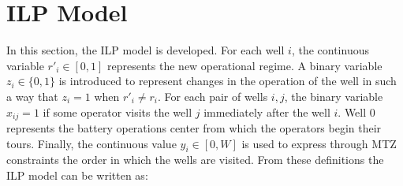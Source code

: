 \section{ILP Model} \label{sec:modelo}
In this section, the ILP model is developed. For each well $i$, the continuous variable $r'_i \in [0,1]$ represents the new operational regime. A binary variable $z_i \in \{0,1\}$ is introduced to represent changes in the operation of the well in such a way that $z_i = 1$ when $r'_i \ne r_i$. For each pair of wells $i,j$, the binary variable $x_{ij}=1$ if some operator visits the well $j$ immediately after the well $i$. Well $0$ represents the battery operations center from which the operators begin their tours. Finally, the continuous value $y_i \in [0,W]$ is used to express through MTZ constraints the order in which the wells are visited. From these definitions the ILP model can be written as:

